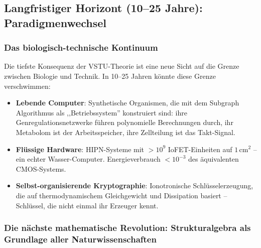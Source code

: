 ﻿\documentclass[a4paper,12pt]{scrreprt}
\theoremstyle{definition}
\begin{document}
\subsection{Langfristiger Horizont (10--25 Jahre): Paradigmenwechsel}

\subsubsection{Das biologisch-technische Kontinuum}

Die tiefste Konsequenz der VSTU-Theorie ist eine neue Sicht auf die
Grenze zwischen Biologie und Technik. In 10--25 Jahren könnte diese
Grenze verschwimmen:

\begin{itemize}
  \item \textbf{Lebende Computer}: Synthetische Organismen, die mit
    dem Subgraph Algorithmus als ,,Betriebssystem'' konstruiert sind:
    ihre Genregulationsnetzwerke führen polynomielle Berechnungen durch,
    ihr Metabolom ist der Arbeitsspeicher, ihre Zellteilung ist
    das Takt-Signal.
  \item \textbf{Flüssige Hardware}: HIPN-Systeme mit
    $> 10^9$ IoFET-Einheiten auf $1$\,cm$^2$ -- ein echter Wasser-Computer.
    Energieverbrauch $< 10^{-3}$ des äquivalenten CMOS-Systems.
  \item \textbf{Selbst-organisierende Kryptographie}: Ionotronische
    Schlüsselerzeugung, die auf thermodynamischem Gleichgewicht und
    Dissipation basiert -- Schlüssel, die nicht einmal ihr Erzeuger
    kennt.
\end{itemize}

\subsubsection{Die nächste mathematische Revolution: Strukturalgebra als
Grundlage aller Naturwissenschaften}
\end{document}
